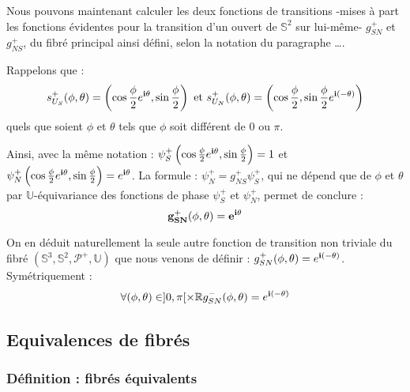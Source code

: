 \begin{exem}
Nous pouvons maintenant calculer les deux fonctions de transitions -mises \`a part les fonctions \'evidentes pour la transition d'un ouvert de $\mathbb{S}^2$ sur lui-m\^eme- %
$g_{SN}^+$ et $g_{NS}^+$, du fibr\'e principal ainsi d\'efini, selon la notation du paragraphe \dots .
\par
Rappelons que : \[\se{S}{+}(\phi ,\theta )=\left(\cos\frac{\phi}{2}\ec{\theta},\sin\frac{\phi}{2}\right)\text{ et }%
\se{N}{+}(\phi ,\theta )=\left(\cos\frac{\phi}{2},\sin\frac{\phi}{2}\ec{(-\theta)}\right)\]
quels que soient $\phi$ et $\theta$ tels que $\phi$ soit diff\'erent de $0$ ou $\pi$.
\par
Ainsi, avec la m\^eme notation : $\psi_S^+\left(\cos\frac{\phi}{2}e^{\mathbf{i}\theta},\sin\frac{\phi}{2}\right)=1$ et $\psi_N^+\left(\cos\frac{\phi}{2}e^{\mathbf{i}\theta},\sin\frac{\phi}{2}\right)=e^{\mathbf{i}\theta}$. %
La formule : $\psi_N^+=g_{NS}^+\psi_S^+$, qui ne d\'epend que de $\phi$ et $\theta$ par $\mathbb{U}$-\'equivariance des fonctions de phase $\psi_S^+$ et $\psi_N^+$, %
permet de conclure :\[\mathbf{g_{SN}^+(\phi ,\theta )=e^{\mathbf{i}\theta}}\]
\par
On en d\'eduit naturellement la seule autre fonction de transition non triviale du fibr\'e $(\mathbb{S}^3,\mathbb{S}^2,\mathcal{P}^+,\mathbb{U})$ que nous venons de d\'efinir : %
$g_{SN}^+(\phi ,\theta )=e^{\mathbf{i}(-\theta )}$.
\etoile
Sym\'etriquement :
\[\forall (\phi,\theta)\in ]0,\pi [\times\mathbb{R}g_{SN}^-(\phi,\theta)=e^{\mathbf{i}(-\theta)}\]
\end{exem}


\subsection{Equivalences de fibr\'es}

\subsubsection{D\'efinition : fibr\'es \'equivalents}

